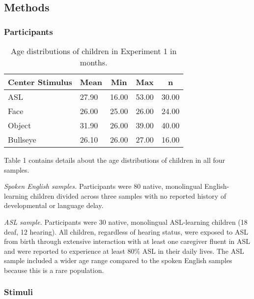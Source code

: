 \documentclass[,man,floatsintext]{apa6}
\begin{document}
\subsection{Methods}\label{methods}

\subsubsection{Participants}\label{participants}

\begin{table}[tbp]
\begin{center}
\begin{threeparttable}
\caption{\label{tab:trio make participants table}Age distributions of children in Experiment 1 in months.}
\begin{tabular}{lllll}
\toprule
Center Stimulus & \multicolumn{1}{c}{Mean} & \multicolumn{1}{c}{Min} & \multicolumn{1}{c}{Max} & \multicolumn{1}{c}{n}\\
\midrule
ASL & 27.90 & 16.00 & 53.00 & 30.00\\
Face & 26.00 & 25.00 & 26.00 & 24.00\\
Object & 31.90 & 26.00 & 39.00 & 40.00\\
Bullseye & 26.10 & 26.00 & 27.00 & 16.00\\
\bottomrule
\end{tabular}
\end{threeparttable}
\end{center}
\end{table}

Table 1 contains details about the age distributions of children in all
four samples.

\emph{Spoken English samples.} Participants were 80 native, monolingual
English-learning children divided across three samples with no reported
history of developmental or language delay.

\emph{ASL sample.} Participants were 30 native, monolingual ASL-learning
children (18 deaf, 12 hearing). All children, regardless of hearing
status, were exposed to ASL from birth through extensive interaction
with at least one caregiver fluent in ASL and were reported to
experience at least 80\% ASL in their daily lives. The ASL sample
included a wider age range compared to the spoken English samples
because this is a rare population.

\subsubsection{Stimuli}\label{stimuli}
\end{document}
